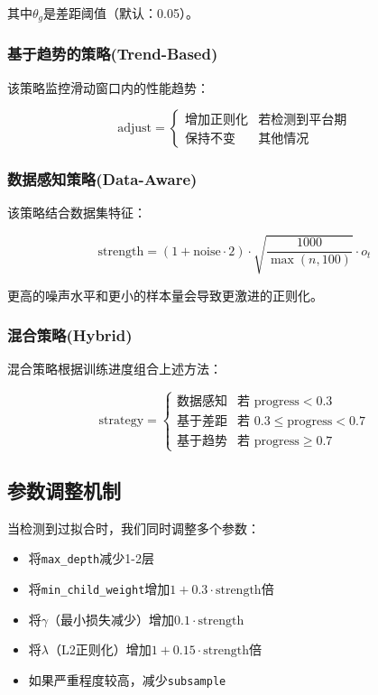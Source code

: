 \documentclass[12pt,a4paper]{article}
\begin{document}
其中$\theta_g$是差距阈值（默认：0.05）。

\subsubsection{基于趋势的策略(Trend-Based)}

该策略监控滑动窗口内的性能趋势：

\begin{equation}
\text{adjust} = 
\begin{cases}
\text{增加正则化} & \text{若检测到平台期} \\
\text{保持不变} & \text{其他情况}
\end{cases}
\end{equation}

\subsubsection{数据感知策略(Data-Aware)}

该策略结合数据集特征：

\begin{equation}
\text{strength} = (1 + \text{noise} \cdot 2) \cdot \sqrt{\frac{1000}{\max(n, 100)}} \cdot o_t
\end{equation}

更高的噪声水平和更小的样本量会导致更激进的正则化。

\subsubsection{混合策略(Hybrid)}

混合策略根据训练进度组合上述方法：

\begin{equation}
\text{strategy} = 
\begin{cases}
\text{数据感知} & \text{若 progress} < 0.3 \\
\text{基于差距} & \text{若 } 0.3 \leq \text{progress} < 0.7 \\
\text{基于趋势} & \text{若 progress} \geq 0.7
\end{cases}
\end{equation}

\subsection{参数调整机制}

当检测到过拟合时，我们同时调整多个参数：

\begin{itemize}[leftmargin=2em]
    \item 将\texttt{max\_depth}减少1-2层
    \item 将\texttt{min\_child\_weight}增加$1 + 0.3 \cdot \text{strength}$倍
    \item 将$\gamma$（最小损失减少）增加$0.1 \cdot \text{strength}$
    \item 将$\lambda$（L2正则化）增加$1 + 0.15 \cdot \text{strength}$倍
    \item 如果严重程度较高，减少\texttt{subsample}
\end{itemize}
\end{document}
